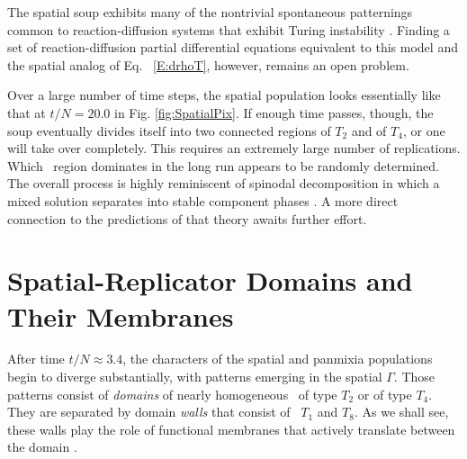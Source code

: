 \documentclass[pre,twocolumn,showpacs,superscriptaddress,preprintnumbers,floatfix]{revtex4}
\theoremstyle{plain}    \newtheorem{Lem}{Lemma}
\theoremstyle{plain}    \newtheorem*{ProLem}{Proof}
\theoremstyle{plain}    \newtheorem{Cor}{Corollary}
\theoremstyle{plain}    \newtheorem*{ProCor}{Proof}
\theoremstyle{plain}    \newtheorem{The}{Theorem}
\theoremstyle{plain}    \newtheorem*{ProThe}{Proof}
\theoremstyle{plain}    \newtheorem{Prop}{Proposition}
\theoremstyle{plain}    \newtheorem*{ProProp}{Proof}
\theoremstyle{plain}    \newtheorem*{Conj}{Conjecture}
\theoremstyle{plain}    \newtheorem*{Rem}{Remark}
\theoremstyle{plain}    \newtheorem{Def}{Definition}
\theoremstyle{plain}    \newtheorem*{Not}{Notation}
\begin{document}
The spatial soup exhibits many of the nontrivial spontaneous patternings
common to reaction-diffusion systems that exhibit Turing instability
\cite{Turi52,Mein82a,Ball99a,Hoyl06a}. Finding a set of reaction-diffusion
partial differential equations equivalent to this model and the spatial analog
of Eq. ~\ref{E:drhoT}, however, remains an open problem. 

Over a large number of time steps, the spatial population looks essentially
like that at $t/N=20.0$ in Fig. \ref{fig:SpatialPix}. If enough time passes,
though, the soup eventually divides itself into two connected regions of $T_2$
and of $T_4$, or one will take over completely. This requires an extremely
large number of replications. Which \eM\ region dominates in the long run
appears to be randomly determined. The overall process is highly reminiscent of
spinodal decomposition in which a mixed solution separates into stable component
phases \cite{Favv08a}. A more direct connection to the predictions of that
theory awaits further effort.

\vspace{-0.2in}
\section{Spatial-Replicator Domains and Their Membranes}
\vspace{-0.1in}

After time $t/N \approx 3.4$, the characters of the spatial and panmixia
populations begin to diverge substantially, with patterns emerging in the
spatial $\Gamma$. Those patterns consist of \emph{domains} of nearly homogeneous
\eMs\ of type $T_2$ or of type $T_4$. They are separated by domain \emph{walls}
that consist of \eMs\ $T_1$ and $T_8$. As we shall see, these walls play the
role of functional membranes that actively translate between the domain \eMs.
\end{document}
